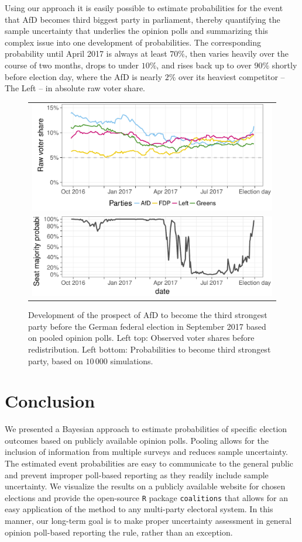 \documentclass[smallcondensed]{svjour3}     %
\begin{document}
Using our approach it is easily possible to estimate probabilities
for the event that AfD becomes third biggest party in parliament,
thereby quantifying the sample uncertainty that underlies the
opinion polls and summarizing this complex issue into one
development of probabilities.
The corresponding probability until April 2017
is always at least $70\%$, then varies heavily over the course
of two months, drops to under $10\%$, and rises back up to
over $90\%$ shortly before election day, where the AfD is
nearly $2\%$ over its heaviest competitor -- The Left -- in
absolute raw voter share.

\begin{figure}[H]\centering
\begin{tabular}{l}
\includegraphics[height=.2\textwidth]{figures/2017_pooled_afd_rawShares.pdf}
\\
\includegraphics[height=.15\textwidth]{figures/2017_pooled_afd_thirdPartyProb.pdf}
\end{tabular}
\caption{Development of the prospect of AfD to become the third strongest party before the German federal election in September 2017 based on pooled opinion polls.
Left top: Observed voter shares before redistribution. Left bottom: Probabilities to become third strongest party, based on $10\,000$ simulations.
\label{fig:2017_afd}
}
\end{figure}

\section{Conclusion} \label{sec:conclusion}
We presented a Bayesian approach to estimate probabilities of specific election outcomes based on
publicly available opinion polls. Pooling allows for the inclusion of information from multiple
surveys and reduces sample uncertainty.
The estimated event probabilities are easy to communicate to the general public and prevent
improper poll-based reporting as they readily include sample uncertainty.
We visualize the results on a publicly available website for chosen elections and
provide the open-source \texttt{R} package \texttt{coalitions} that allows for an easy
application of the method to any multi-party electoral system.
In this manner, our long-term goal is to make proper uncertainty assessment
in general opinion poll-based reporting the rule, rather than an exception.
\end{document}
